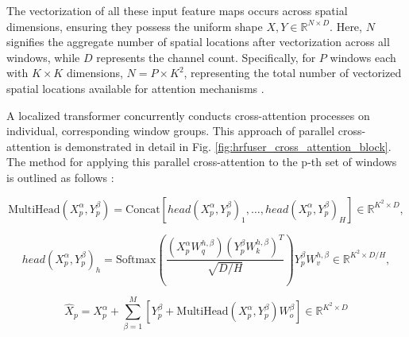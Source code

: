 \documentclass[report.tex]{subfiles}
\begin{document}
    The vectorization of all these input feature maps occurs across spatial dimensions, ensuring they possess the uniform shape \( X, Y \in \mathbb{R}^{N \times D} \). Here, \( N \) signifies the aggregate number of spatial locations after vectorization across all windows, while \( D \) represents the channel count. Specifically, for \( P \) windows each with \( K \times K \) dimensions, \( N = P \times K^2 \), representing the total number of vectorized spatial locations available for attention mechanisms \cite{broedermann2022hrfuser}.




    A localized transformer concurrently conducts cross-attention processes on individual, corresponding window groups. This approach of parallel cross-attention is demonstrated in detail in Fig. \ref{fig:hrfuser_cross_attention_block}. The method for applying this parallel cross-attention to the p-th set of windows is outlined as follows \cite{broedermann2022hrfuser}:

    \begin{equation}
        \text{MultiHead}(X^{\alpha}_p, Y^{\beta}_p) = \text{Concat}[head(X^{\alpha}_p, Y^{\beta}_p)_1, \ldots, head(X^{\alpha}_p, Y^{\beta}_p)_H] \in \mathbb{R}^{K^2 \times D},
        \end{equation}
        
        \begin{equation}
        head(X^{\alpha}_p, Y^{\beta}_p)_h = \text{Softmax}\left( \frac{(X^{\alpha}_p W^{h,\beta}_q)(Y^{\beta}_p W^{h,\beta}_k)^T}{\sqrt{D/H}} \right) Y^{\beta}_p W^{h,\beta}_v \in \mathbb{R}^{K^2 \times D/H},
        \end{equation}
        
        \begin{equation}
        \hat{X}_p = X^{\alpha}_p + \sum_{\beta=1}^{M} \left[ Y^{\beta}_p + \text{MultiHead}(X^{\alpha}_p, Y^{\beta}_p)W^{\beta}_o \right] \in \mathbb{R}^{K^2 \times D}
        \end{equation}
        
\end{document}
